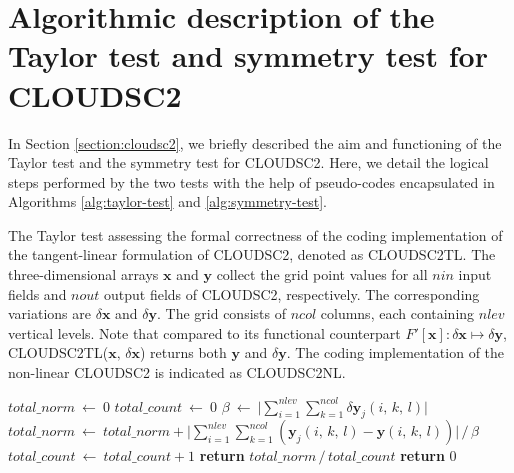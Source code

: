 \documentclass[gmd,manuscript,online]{copernicus}
\theoremstyle{theorem}
\theoremstyle{definition}
\theoremstyle{remark}
\theoremstyle{proposition}
\begin{document}
	\appendix

	\section{Algorithmic description of the Taylor test and symmetry test for CLOUDSC2}
	\label{section:appendix}

	In Section \ref{section:cloudsc2}, we briefly described the aim and functioning of the Taylor test and the symmetry test for CLOUDSC2. Here, we detail the logical steps performed by the two tests with the help of pseudo-codes encapsulated in Algorithms \ref{alg:taylor-test} and \ref{alg:symmetry-test}.

	\begin{algorithm}[H]
		\caption{The Taylor test assessing the formal correctness of the coding implementation of the tangent-linear formulation of CLOUDSC2, denoted as \textsc{CLOUDSC2TL}. The three-dimensional arrays $\mathbf{x}$ and $\mathbf{y}$ collect the grid point values for all $nin$ input fields and $nout$ output fields of CLOUDSC2, respectively. The corresponding variations are $\delta \mathbf{x}$ and $\delta \mathbf{y}$. The grid consists of $ncol$ columns, each containing $nlev$ vertical levels. Note that compared to its functional counterpart $F' \left[\boldsymbol{x} \right] : \delta \boldsymbol{x} \mapsto \delta \boldsymbol{y}$, \textsc{CLOUDSC2TL($\mathbf{x}, \, \delta \mathbf{x}$)} returns both $\mathbf{y}$ and $\delta \mathbf{y}$. The coding implementation of the non-linear CLOUDSC2 is indicated as \textsc{CLOUDSC2NL}.}
		\label{alg:taylor-test}

		\begin{algorithmic}[1]
			 
			\State $total\_norm ~ \gets ~ 0$
			\State $total\_count ~ \gets ~ 0$
				\State $\beta ~ \gets ~ \big| \sum_{i=1}^{nlev} \sum_{k=1}^{ncol} \delta \mathbf{y}_j \left( i, \, k, \, l \right) \big|$
					\State $total\_norm ~ \gets ~ total\_norm + \big| \sum_{i=1}^{nlev} \sum_{k=1}^{ncol} \left( \mathbf{y}_j \left( i, \, k, \, l \right) - \mathbf{y} \left( i, \, k, \, l \right) \right) \big| \, / \, \beta$
					\State $total\_count ~ \gets ~ total\_count + 1$
				\EndIf
			\EndFor
				\State \textbf{return} $total\_norm \, / \, total\_count$
			\Else
				\State \textbf{return} 0
			\EndIf
			\EndFunction


\end{algorithmic}
\end{algorithm}
\end{document}
